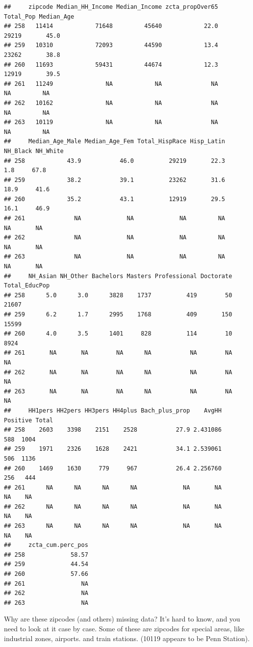 \documentclass[openany]{book}
\begin{document}
\begin{verbatim}
##     zipcode Median_HH_Income Median_Income zcta_propOver65 Total_Pop Median_Age
## 258   11414            71648         45640            22.0     29219       45.0
## 259   10310            72093         44590            13.4     23262       38.8
## 260   11693            59431         44674            12.3     12919       39.5
## 261   11249               NA            NA              NA        NA         NA
## 262   10162               NA            NA              NA        NA         NA
## 263   10119               NA            NA              NA        NA         NA
##     Median_Age_Male Median_Age_Fem Total_HispRace Hisp_Latin NH_Black NH_White
## 258            43.9           46.0          29219       22.3      1.8     67.8
## 259            38.2           39.1          23262       31.6     18.9     41.6
## 260            35.2           43.1          12919       29.5     16.1     46.9
## 261              NA             NA             NA         NA       NA       NA
## 262              NA             NA             NA         NA       NA       NA
## 263              NA             NA             NA         NA       NA       NA
##     NH_Asian NH_Other Bachelors Masters Professional Doctorate Total_EducPop
## 258      5.0      3.0      3828    1737          419        50         21607
## 259      6.2      1.7      2995    1768          409       150         15599
## 260      4.0      3.5      1401     828          114        10          8924
## 261       NA       NA        NA      NA           NA        NA            NA
## 262       NA       NA        NA      NA           NA        NA            NA
## 263       NA       NA        NA      NA           NA        NA            NA
##     HH1pers HH2pers HH3pers HH4plus Bach_plus_prop    AvgHH Positive Total
## 258    2603    3398    2151    2528           27.9 2.431086      588  1004
## 259    1971    2326    1628    2421           34.1 2.539061      506  1136
## 260    1469    1630     779     967           26.4 2.256760      256   444
## 261      NA      NA      NA      NA             NA       NA       NA    NA
## 262      NA      NA      NA      NA             NA       NA       NA    NA
## 263      NA      NA      NA      NA             NA       NA       NA    NA
##     zcta_cum.perc_pos
## 258             58.57
## 259             44.54
## 260             57.66
## 261                NA
## 262                NA
## 263                NA
\end{verbatim}

Why are these zipcodes (and others) missing data? It's hard to know, and you need to look at it case by case. Some of these are zipcodes for special areas, like industrial zones, airports. and train stations. (10119 appears to be Penn Station).
\end{document}
